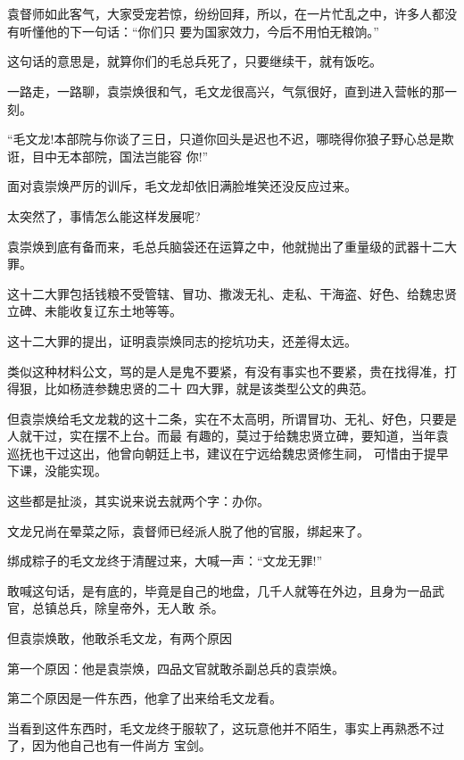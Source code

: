\documentclass[11pt,a4paper,onecolumn]{article}
\begin{document}
\section[\thesection]{}

袁督师如此客气，大家受宠若惊，纷纷回拜，所以，在一片忙乱之中，许多人都没有听懂他的下一句话：``你们只
要为国家效力，今后不用怕无粮饷。''

这句话的意思是，就算你们的毛总兵死了，只要继续干，就有饭吃。

一路走，一路聊，袁崇焕很和气，毛文龙很高兴，气氛很好，直到进入营帐的那一刻。

``毛文龙!本部院与你谈了三日，只道你回头是迟也不迟，哪晓得你狼子野心总是欺诳，目中无本部院，国法岂能容
你!''

面对袁崇焕严厉的训斥，毛文龙却依旧满脸堆笑\myrule 还没反应过来。

太突然了，事情怎么能这样发展呢?

袁崇焕到底有备而来，毛总兵脑袋还在运算之中，他就抛出了重量级的武器\myrule 十二大罪。

这十二大罪包括钱粮不受管辖、冒功、撒泼无礼、走私、干海盗、好色、给魏忠贤立碑、未能收复辽东土地等等。

这十二大罪的提出，证明袁崇焕同志的挖坑功夫，还差得太远。

类似这种材料公文，骂的是人是鬼不要紧，有没有事实也不要紧，贵在找得准，打得狠，比如杨涟参魏忠贤的二十
四大罪，就是该类型公文的典范。

但袁崇焕给毛文龙栽的这十二条，实在不太高明，所谓冒功、无礼、好色，只要是人就干过，实在摆不上台。而最
有趣的，莫过于给魏忠贤立碑，要知道，当年袁巡抚也干过这出，他曾向朝廷上书，建议在宁远给魏忠贤修生祠，
可惜由于提早下课，没能实现。

这些都是扯淡，其实说来说去就两个字：办你。

文龙兄尚在晕菜之际，袁督师已经派人脱了他的官服，绑起来了。

绑成粽子的毛文龙终于清醒过来，大喊一声：``文龙无罪!''

敢喊这句话，是有底的，毕竟是自己的地盘，几千人就等在外边，且身为一品武官，总镇总兵，除皇帝外，无人敢
杀。

但袁崇焕敢，他敢杀毛文龙，有两个原因

第一个原因：他是袁崇焕，四品文官就敢杀副总兵的袁崇焕。

第二个原因是一件东西，他拿了出来给毛文龙看。

当看到这件东西时，毛文龙终于服软了，这玩意他并不陌生，事实上再熟悉不过了，因为他自己也有一件\myrule 尚方
宝剑。
\end{document}
